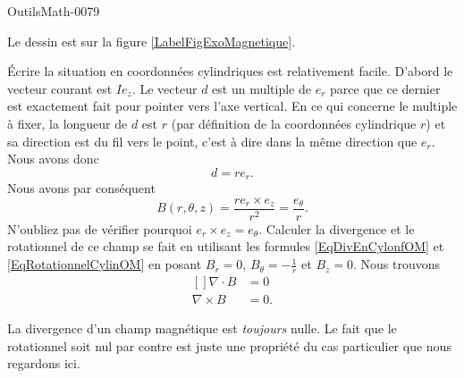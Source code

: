 
\begin{corrige}{OutilsMath-0079}

    Le dessin est sur la figure \ref{LabelFigExoMagnetique}.
    \newcommand{\CaptionFigExoMagnetique}{La façon naturelle de décrire la situation sont les coordonnées cylindriques.}
    

    Écrire la situation en coordonnées cylindriques est relativement facile. D'abord le vecteur courant est $Ie_z$. Le vecteur $d$ est un multiple de $e_r$ parce que ce dernier est exactement fait pour pointer vers l'axe vertical. En ce qui concerne le multiple à fixer, la longueur de $d$ est $r$ (par définition de la coordonnées cylindrique $r$) et sa direction est du fil vers le point, c'est à dire dans la même direction que $e_r$. Nous avons donc
    \begin{equation}
        d=re_r.
    \end{equation}
    Nous avons par conséquent
    \begin{equation}
        B(r,\theta,z)=\frac{ re_r\times e_z }{ r^2 }=\frac{ e_{\theta} }{ r }.
    \end{equation}
    N'oubliez pas de vérifier pourquoi $e_r\times e_z=e_{\theta}$. Calculer la divergence et le rotationnel de ce champ se fait en utilisant les formules \eqref{EqDivEnCylonfOM} et \eqref{EqRotationnelCylinOM} en posant $B_r=0$, $B_{\theta}=-\frac{1}{ r }$ et $B_z=0$. Nous trouvons
    \begin{equation}
        \begin{aligned}[]
            \nabla\cdot B&=0\\
            \nabla\times B&=0.
        \end{aligned}
    \end{equation}
    
    \begin{remark}
        La divergence d'un champ magnétique est \emph{toujours} nulle. Le fait que le rotationnel soit nul par contre est juste une propriété du cas particulier que nous regardons ici.
    \end{remark}

\end{corrige}
